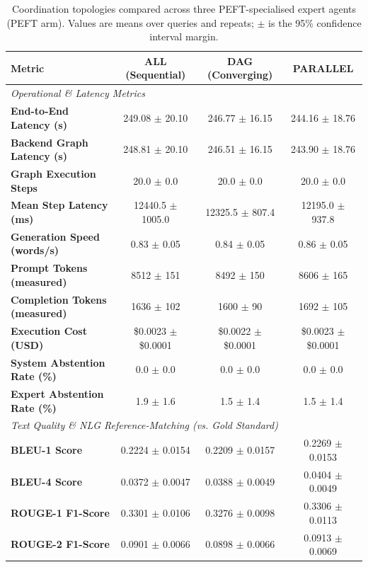 \begin{table}[t]
\centering
\caption{Coordination topologies compared across three PEFT-specialised expert agents (PEFT arm). Values are means over queries and repeats; $\pm$ is the 95\% confidence interval margin.}
\label{tab:agent_workflows_eval}
\small
\begin{tabular}{lccc}
\toprule
\textbf{Metric} & \textbf{ALL (Sequential)} & \textbf{DAG (Converging)} & \textbf{PARALLEL} \\
\midrule
\multicolumn{4}{l}{\textit{Operational \& Latency Metrics}} \\
\textbf{End-to-End Latency (s)} & 249.08 $\pm$ 20.10 & 246.77 $\pm$ 16.15 & 244.16 $\pm$ 18.76 \\
\textbf{Backend Graph Latency (s)} & 248.81 $\pm$ 20.10 & 246.51 $\pm$ 16.15 & 243.90 $\pm$ 18.76 \\
\textbf{Graph Execution Steps} & 20.0 $\pm$ 0.0 & 20.0 $\pm$ 0.0 & 20.0 $\pm$ 0.0 \\
\textbf{Mean Step Latency (ms)} & 12440.5 $\pm$ 1005.0 & 12325.5 $\pm$ 807.4 & 12195.0 $\pm$ 937.8 \\
\textbf{Generation Speed (words/s)} & 0.83 $\pm$ 0.05 & 0.84 $\pm$ 0.05 & 0.86 $\pm$ 0.05 \\
\textbf{Prompt Tokens (measured)} & 8512 $\pm$ 151 & 8492 $\pm$ 150 & 8606 $\pm$ 165 \\
\textbf{Completion Tokens (measured)} & 1636 $\pm$ 102 & 1600 $\pm$ 90 & 1692 $\pm$ 105 \\
\textbf{Execution Cost (USD)} & \$0.0023 $\pm$ \$0.0001 & \$0.0022 $\pm$ \$0.0001 & \$0.0023 $\pm$ \$0.0001 \\
\textbf{System Abstention Rate (\%)} & 0.0 $\pm$ 0.0 & 0.0 $\pm$ 0.0 & 0.0 $\pm$ 0.0 \\
\textbf{Expert Abstention Rate (\%)} & 1.9 $\pm$ 1.6 & 1.5 $\pm$ 1.4 & 1.5 $\pm$ 1.4 \\
\midrule
\multicolumn{4}{l}{\textit{Text Quality \& NLG Reference-Matching (vs. Gold Standard)}} \\
\textbf{BLEU-1 Score} & 0.2224 $\pm$ 0.0154 & 0.2209 $\pm$ 0.0157 & 0.2269 $\pm$ 0.0153 \\
\textbf{BLEU-4 Score} & 0.0372 $\pm$ 0.0047 & 0.0388 $\pm$ 0.0049 & 0.0404 $\pm$ 0.0049 \\
\textbf{ROUGE-1 F1-Score} & 0.3301 $\pm$ 0.0106 & 0.3276 $\pm$ 0.0098 & 0.3306 $\pm$ 0.0113 \\
\textbf{ROUGE-2 F1-Score} & 0.0901 $\pm$ 0.0066 & 0.0898 $\pm$ 0.0066 & 0.0913 $\pm$ 0.0069 \\

\end{tabular}
\end{table}
